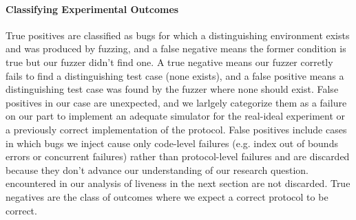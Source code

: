 \paragraph{Classifying Experimental Outcomes}
True positives are classified as bugs for which a distinguishing environment
exists and was produced by fuzzing, and a false negative means the former
condition is true but our fuzzer didn't find one.  A true negative means our
fuzzer corretly fails to find a distinguishing test case (none exists), and a
false positive means a distinguishing test case was found by the fuzzer where
none should exist.  False positives in our case are unexpected, and we larlgely
categorize them as a failure on our part to implement an adequate simulator for
the real-ideal experiment or a previously correct implementation of the
protocol.  False positives include cases in which bugs we inject cause only
code-level failures (e.g. index out of bounds errors or concurrent failures)
rather than protocol-level failures and are discarded because they don't
advance our understanding of our research question.  %
encountered in our analysis of liveness in the next section are not discarded.
True negatives are the class of outcomes where we expect a correct protocol to
be correct. 

